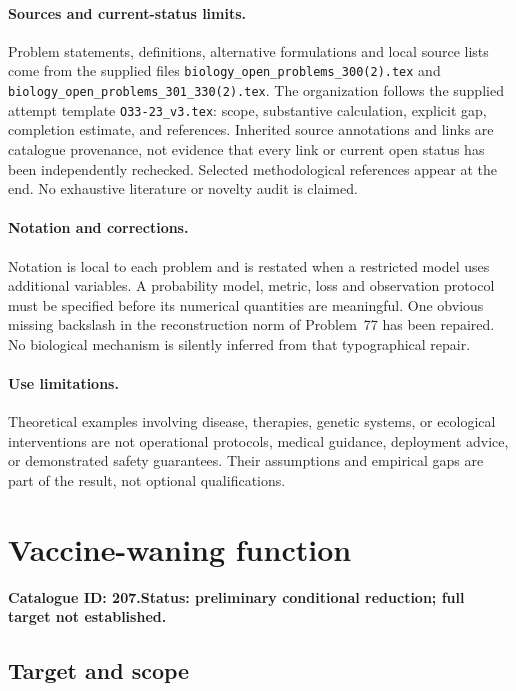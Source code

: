 \documentclass[11pt]{article}
\begin{document}
\paragraph{Sources and current-status limits.}
Problem statements, definitions, alternative formulations and local source lists
come from the supplied files
\texttt{biology\_open\_problems\_300(2).tex} and
\texttt{biology\_open\_problems\_301\_330(2).tex}.
The organization follows the supplied attempt template
\texttt{O33-23\_v3.tex}: scope, substantive calculation, explicit gap,
completion estimate, and references. Inherited source annotations and links are
catalogue provenance, not evidence that every link or current open status has
been independently rechecked. Selected methodological references appear at the
end. No exhaustive literature or novelty audit is claimed.

\paragraph{Notation and corrections.}
Notation is local to each problem and is restated when a restricted model uses
additional variables. A probability model, metric, loss and observation protocol
must be specified before its numerical quantities are meaningful. One obvious
missing backslash in the reconstruction norm of Problem~77 has been repaired.
No biological mechanism is silently inferred from that typographical repair.

\paragraph{Use limitations.}
Theoretical examples involving disease, therapies, genetic systems, or ecological
interventions are not operational protocols, medical guidance, deployment advice,
or demonstrated safety guarantees. Their assumptions and empirical gaps are part
of the result, not optional qualifications.

\setcounter{section}{206}
\section{Vaccine-waning function}
\label{prob:207}
\noindent\textbf{Catalogue ID: 207.}\quad \textbf{Status: preliminary conditional reduction; full target not established.}
\subsection{Target and scope}
\end{document}
